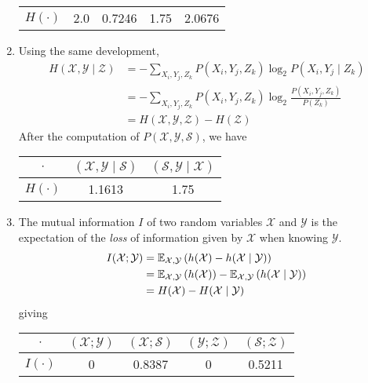 \documentclass[a4paper, 12pt]{article}
\renewcommand{\S}{\mathcal{S}}
\newcommand{\X}{\mathcal{X}}
\newcommand{\Y}{\mathcal{Y}}
\newcommand{\Z}{\mathcal{Z}}
\begin{document}
\begin{enumerate}[leftmargin=*]
\begin{table}[H]
\begin{tabular}{c|cccc}
                $H(\cdot)$ & \num{2.0} & \num{0.7246} & \num{1.75} & \num{2.0676} \\
            \end{tabular}
            \label{tab:conditional_entropy}
        \end{table}
        \item Using the same development,
        \begin{align}
            H(\X, \Y \mid \Z) & = - \sum_{X_i, Y_j, Z_k} P(X_i, Y_j, Z_k) \log_2 P(X_i, Y_j \mid Z_k) \nonumber \\
            & = - \sum_{X_i, Y_j, Z_k} P(X_i, Y_j, Z_k) \log_2 \frac{P(X_i, Y_j, Z_k)}{P(Z_k)} \nonumber \\
            & = H(\X,\Y,\Z) - H(\Z) \label{eq:conditional_joint_entropy}
        \end{align}
        After the computation of $P(\X, \Y, \S)$, we have
        \begin{table}[H]
            \centering
            \begin{tabular}{c|cc}
                $\cdot$ & $(\X, \Y \mid \S)$ & $(\S, \Y \mid \X)$ \\ \hline
                $H(\cdot)$ & \num{1.1613} & \num{1.75} \\
            \end{tabular}
            \label{tab:conditional_joint_entropy}
        \end{table}
        \item The mutual information $I$ of two random variables $\X$ and $\Y$ is the expectation of the \emph{loss} of information given by $\X$ when knowing $\Y$.
        \begin{align}
            I(\X; \Y) & = \mathbb{E}_{\X, \Y} \rbk{h(\X) - h(\X \mid \Y)} \nonumber \\
            & = \mathbb{E}_{\X, \Y} \rbk{h(\X)} - \mathbb{E}_{\X, \Y} \rbk{h(\X \mid \Y)} \nonumber \\
            & = H(\X) - H(\X \mid \Y) \label{eq:mutual_information}
        \end{align}
        giving
        \begin{table}[H]
            \centering
            \begin{tabular}{c|cccc}
                $\cdot$ & $(\X; \Y)$ & $(\X; \S)$ & $(\Y; \Z)$ & $(\S; \Z)$ \\ \hline
                $I(\cdot)$ & \num{0} & \num{0.8387} & \num{0} & \num{0.5211} \\

\end{tabular}
\end{table}
\end{enumerate}
\end{document}
